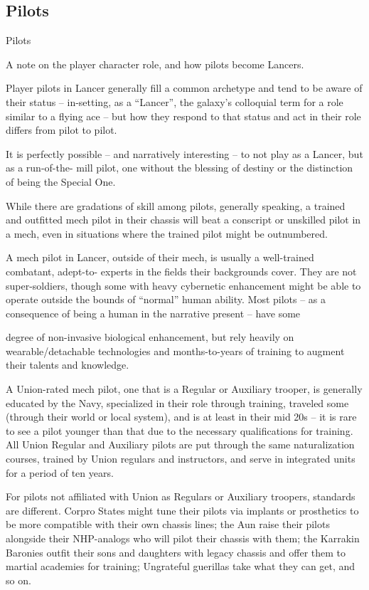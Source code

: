 \subsection{Pilots}
Pilots

A note on the player character role, and how pilots become Lancers.


Player pilots in Lancer generally fill a common archetype and tend to be aware of their status --
in-setting, as a “Lancer”, the galaxy’s colloquial term for a role similar to a flying ace --  but how
they respond to that status and act in their role differs from pilot to pilot.


It is perfectly possible -- and narratively interesting -- to not play as a Lancer, but as a run-of-the-
mill pilot, one without the blessing of destiny or the distinction of being the Special One.


While there are gradations of skill among pilots, generally speaking, a trained and outfitted mech
pilot in their chassis will beat a conscript or unskilled pilot in a mech, even in situations where the
trained pilot might be outnumbered.


A mech pilot in Lancer, outside of their mech, is usually a well-trained combatant, adept-to-
experts in the fields their backgrounds cover. They are not super-soldiers, though some with
heavy cybernetic enhancement might be able to operate outside the bounds of “normal” human
ability. Most pilots -- as a consequence of being a human in the narrative present -- have some




degree of non-invasive biological enhancement, but rely heavily on wearable/detachable
technologies and months-to-years of training to augment their talents and knowledge.


A Union-rated mech pilot, one that is a Regular or Auxiliary trooper, is generally educated by the
Navy, specialized in their role through training, traveled some (through their world or local
system), and is at least in their mid 20s -- it is rare to see a pilot younger than that due to the
necessary qualifications for training. All Union Regular and Auxiliary pilots are put through the
same naturalization courses, trained by Union regulars and instructors, and serve in integrated
units for a period of ten years.


For pilots not affiliated with Union as Regulars or Auxiliary troopers, standards are different.
Corpro States might tune their pilots via implants or prosthetics to be more compatible with their
own chassis lines; the Aun raise their pilots alongside their NHP-analogs who will pilot their
chassis with them; the Karrakin Baronies outfit their sons and daughters with legacy chassis and
offer them to martial academies for training; Ungrateful guerillas take what they can get, and so
on.


